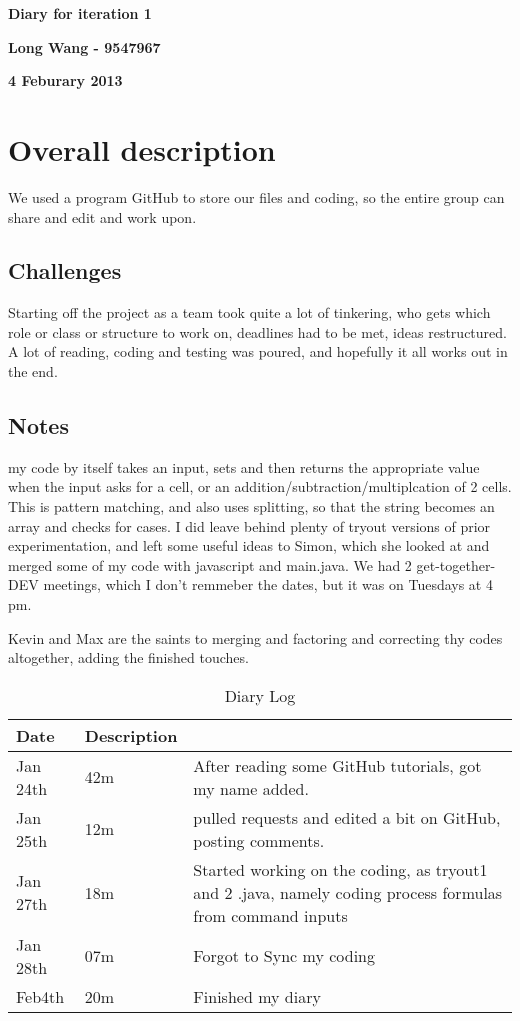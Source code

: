 \documentclass[12pt]{article}
\begin{document}
\vspace*{0.5in}
\centerline{\bf\Large Diary for iteration 1}

\vspace*{0.5in}
\centerline{\bf\Large Long Wang - 9547967}

\vspace*{0.5in}
\centerline{\bf\Large 4 Feburary 2013}

\clearpage

\section{Overall description}
We used a program GitHub to store our files and coding, so the entire group can share and edit and work upon.
\subsection{Challenges}
Starting off the project as a team took quite a lot of tinkering, who gets which role or class or structure to work on, deadlines had to be met, ideas restructured.  A lot of reading, coding and testing was poured, and hopefully it all works out in the end.  
\subsection{Notes} 
my code by itself takes an input, sets and then returns the appropriate value when the input asks for a cell, or an addition/subtraction/multiplcation of 2 cells. This is pattern matching, and also uses splitting, so that the string becomes an array and checks for cases. I did leave behind plenty of tryout versions of prior experimentation, and left some useful ideas to Simon, which she looked at and merged some of my code with javascript and main.java.  We had 2 get-together-DEV meetings, which I don't remmeber the dates, but it was on Tuesdays at 4 pm.  

Kevin and Max are the saints to merging and factoring and correcting thy codes altogether, adding the finished touches.
\begin{table}[htbp]
\caption{Diary Log}
\begin{tabular}{|l|l | p{12cm}|}
\hline
Date & Description \\\hline\hline
Jan 24th & 42m &After reading some GitHub tutorials, got my name added. \\\hline\hline
Jan 25th& 12m & pulled requests and edited a bit on GitHub, posting comments. \\\hline\hline
Jan 27th& 18m & Started working on the coding, as tryout1 and 2 .java, namely coding process formulas from command inputs \\\hline\hline
Jan 28th& 07m & Forgot to Sync my coding \\\hline\hline
Feb4th & 20m & Finished my diary \\\hline\hline

\end{tabular}
\end{table}
\end{document}

